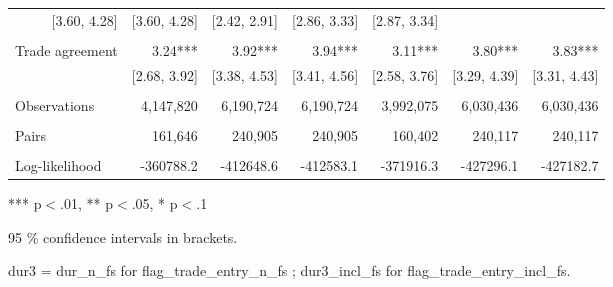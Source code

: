 \begin{table}[!h]
\begin{tabular}{lllllll}
  \multicolumn{1}{r}{[3.60,    4.28]} &
  \multicolumn{1}{r}{[3.60,    4.28]} &
  \multicolumn{1}{r}{[2.42,    2.91]} &
  \multicolumn{1}{r}{[2.86,    3.33]} &
  \multicolumn{1}{r}{[2.87,    3.34]} \\
\multicolumn{1}{l}{} &
  \multicolumn{1}{|r}{} &
  \multicolumn{1}{r}{} &
  \multicolumn{1}{r}{} &
  \multicolumn{1}{r}{} &
  \multicolumn{1}{r}{} &
  \multicolumn{1}{r}{} \\
\multicolumn{1}{l}{Trade agreement} &
  \multicolumn{1}{|r}{3.24***} &
  \multicolumn{1}{r}{3.92***} &
  \multicolumn{1}{r}{3.94***} &
  \multicolumn{1}{r}{3.11***} &
  \multicolumn{1}{r}{3.80***} &
  \multicolumn{1}{r}{3.83***} \\
\multicolumn{1}{l}{} &
  \multicolumn{1}{|r}{[2.68,    3.92]} &
  \multicolumn{1}{r}{[3.38,    4.53]} &
  \multicolumn{1}{r}{[3.41,    4.56]} &
  \multicolumn{1}{r}{[2.58,    3.76]} &
  \multicolumn{1}{r}{[3.29,    4.39]} &
  \multicolumn{1}{r}{[3.31,    4.43]} \\
\multicolumn{1}{l}{} &
  \multicolumn{1}{|r}{} &
  \multicolumn{1}{r}{} &
  \multicolumn{1}{r}{} &
  \multicolumn{1}{r}{} &
  \multicolumn{1}{r}{} &
  \multicolumn{1}{r}{} \\
\multicolumn{1}{l}{Observations} &
  \multicolumn{1}{|r}{4,147,820} &
  \multicolumn{1}{r}{6,190,724} &
  \multicolumn{1}{r}{6,190,724} &
  \multicolumn{1}{r}{3,992,075} &
  \multicolumn{1}{r}{6,030,436} &
  \multicolumn{1}{r}{6,030,436} \\
\multicolumn{1}{l}{} &
  \multicolumn{1}{|r}{} &
  \multicolumn{1}{r}{} &
  \multicolumn{1}{r}{} &
  \multicolumn{1}{r}{} &
  \multicolumn{1}{r}{} &
  \multicolumn{1}{r}{} \\
\multicolumn{1}{l}{Pairs} &
  \multicolumn{1}{|r}{161,646} &
  \multicolumn{1}{r}{240,905} &
  \multicolumn{1}{r}{240,905} &
  \multicolumn{1}{r}{160,402} &
  \multicolumn{1}{r}{240,117} &
  \multicolumn{1}{r}{240,117} \\
\multicolumn{1}{l}{} &
  \multicolumn{1}{|r}{} &
  \multicolumn{1}{r}{} &
  \multicolumn{1}{r}{} &
  \multicolumn{1}{r}{} &
  \multicolumn{1}{r}{} &
  \multicolumn{1}{r}{} \\
\multicolumn{1}{l}{Log-likelihood} &
  \multicolumn{1}{|r}{-360788.2} &
  \multicolumn{1}{r}{-412648.6} &
  \multicolumn{1}{r}{-412583.1} &
  \multicolumn{1}{r}{-371916.3} &
  \multicolumn{1}{r}{-427296.1} &
  \multicolumn{1}{r}{-427182.7} \\
\cline{1-7}
\end{tabular}

\footnotesize{
*** p$<$.01, ** p$<$.05, * p$<$.1

95 \% confidence intervals in brackets.

dur3 = dur\_n\_fs for flag\_trade\_entry\_n\_fs ; dur3\_incl\_fs for flag\_trade\_entry\_incl\_fs.
}
\end{table}
